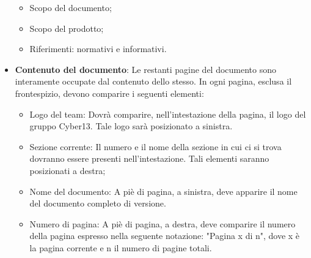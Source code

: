 \begin{itemize}
                \begin{itemize}
                    \item Scopo del documento;
                    \item Scopo del prodotto;
                    \item Riferimenti: normativi e informativi.
                \end{itemize}
            \item \textbf{Contenuto del documento}: Le restanti pagine del documento sono interamente occupate dal contenuto dello stesso. In ogni pagina, esclusa il frontespizio, devono comparire i seguenti elementi:
                \begin{itemize}
                    \item Logo del team: Dovrà comparire, nell’intestazione della pagina, il logo del gruppo Cyber13. Tale logo sarà posizionato a sinistra.
                    \item Sezione corrente: Il numero e il nome della sezione in cui ci si trova dovranno essere presenti nell'intestazione. Tali elementi saranno posizionati a destra;
                    \item Nome del documento: A piè di pagina, a sinistra, deve apparire il nome del documento completo di versione.
                    \item Numero di pagina: A piè di pagina, a destra, deve comparire il numero della pagina espresso nella seguente notazione: "Pagina x di n", dove x è la pagina corrente e n il numero di pagine totali.
                \end{itemize}
        \end{itemize}
        
